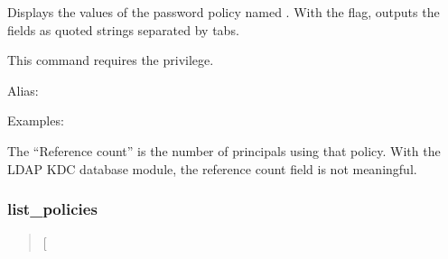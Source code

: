 \documentclass[letterpaper,10pt,english]{sphinxmanual}
\begin{document}
Displays the values of the password policy named .  With the
 flag, outputs the fields as quoted strings separated by
tabs.

This command requires the  privilege.

Alias: 

Examples:

%
\begin{sphinxVerbatim}[commandchars=\\\{\}]
  
 
     
   
   
      
     
  

   
                       
\end{sphinxVerbatim}

The “Reference count” is the number of principals using that policy.
With the LDAP KDC database module, the reference count field is not
meaningful.

\label{\detokenize{admin/admin_commands/kadmin_local:get-policy-end}}

\subsubsection{list\_policies}
\label{\detokenize{admin/admin_commands/kadmin_local:get-policy-end}}\label{\detokenize{admin/admin_commands/kadmin_local:list-policies}}\label{\detokenize{admin/admin_commands/kadmin_local:id16}}\begin{quote}

 {[}\sphinxstyleemphasis{expression}{]}
\end{quote}
\end{document}
